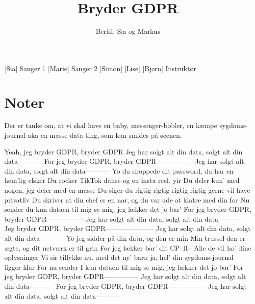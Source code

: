 \documentclass[a4paper,11pt]{article}
\title{Bryder GDPR}
\author{Bertil, Sia og Markus}
\begin{document}
\maketitle

\begin{roles}
[Sia] Sanger 1
[Marie] Sanger 2
[Simon] 
[Lise]
[Bjørn] Instruktør
\end{roles} 

\section*{Noter}
Der er tanke om, at vi skal have en baby, messenger-bobler, en kæmpe sygdoms-journal aka en masse data-ting, som kan smides på scenen. 

\begin{props}
\prop{}
\prop{}
\prop{}
\prop{}
\prop{}
\prop{}
\end{props}



\begin{song}
Yeah, jeg bryder GDPR, bryder GDPR
Jeg har solgt alt din data, solgt alt din data—--------
For jeg bryder GDPR, bryder GDPR—-------------
Jeg har solgt alt din data, solgt alt din data—--------
Yo du droppede dit password, du har en hem’lig  elsker
Du rocker TikTok danse og en insta reel, yir
Du deler kun' med nogen, jeg deler med en masse
Du siger du rigtig rigtig rigtig rigtig gerne vil have privatliv
Du skriver at din chef er en nar, og du var ude at klatre med din far
Nu sender du kun dataen til mig
se mig, jeg lækker det jo bar’
For jeg bryder GDPR, bryder GDPR—-------------
Jeg har solgt alt din data, solgt alt din data—--------
Jeg bryder GDPR, bryder GDPR—------------------
Jeg har solgt alt din data, solgt alt din data—--------
Yo jeg sidder på din data, og den er min
Min trussel den er ægte, og dit netværk er til grin
For  jeg lækker bar’ dit  CP–R–
Alle de vil ha’ dine oplysninger
Vi sir tillykke nu, med det ny’ barn
ja, hel’ din sygdoms-journal ligger klar
For nu sender I kun dataen til mig
se mig, jeg lækker det jo bar’
For jeg bryder GDPR, bryder GDPR—------------
Jeg har solgt alt din data, solgt alt din data—--------
For jeg bryder GDPR, bryder GDPR—--------------
Jeg har solgt alt din data, solgt alt din data—--------



\end{song}
\end{document}
